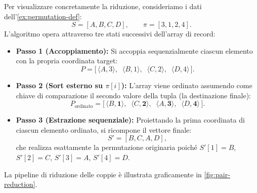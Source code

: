 \begin{example}
\label{ex:pair-reduction-trace}
Per visualizzare concretamente la riduzione, consideriamo i dati dell'\autoref{ex:permutation-def}:
\[
  S = [A, B, C, D], \qquad \pi = [3, 1, 2, 4].
\]
L'algoritmo opera attraverso tre stati successivi dell'array di record:
\begin{itemize}
  \item \textbf{Passo 1 (Accoppiamento):} Si accoppia sequenzialmente ciascun elemento con la propria coordinata target:
  \[
    P = \big[ \, \langle A, 3 \rangle, \;\; \langle B, 1 \rangle, \;\; \langle C, 2 \rangle, \;\; \langle D, 4 \rangle \, \big].
  \]
  \item \textbf{Passo 2 (Sort esterno su $\pi[i]$):} L'array viene ordinato assumendo come chiave di comparazione il secondo valore della tupla (la destinazione finale):
  \[
    P_{\text{ordinato}} = \big[ \, \langle B, \mathbf{1} \rangle, \;\; \langle C, \mathbf{2} \rangle, \;\; \langle A, \mathbf{3} \rangle, \;\; \langle D, \mathbf{4} \rangle \, \big].
  \]
  \item \textbf{Passo 3 (Estrazione sequenziale):} Proiettando la prima coordinata di ciascun elemento ordinato, si ricompone il vettore finale:
  \[
    S' = [B, C, A, D],
  \]
  che realizza esattamente la permutazione originaria poiché $S'[1]=B$, $S'[2]=C$, $S'[3]=A$, $S'[4]=D$.
\end{itemize}
\end{example}

La pipeline di riduzione delle coppie è illustrata graficamente in \autoref{fig:pair-reduction}.

